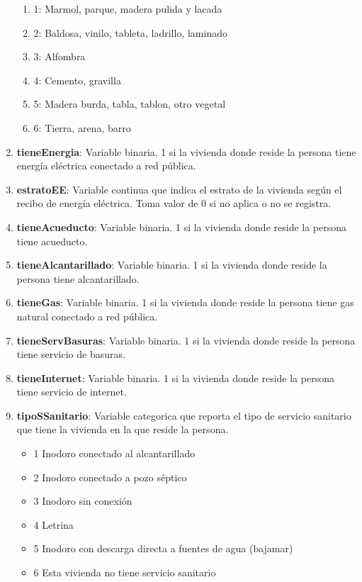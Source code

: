 \documentclass[12pt,a4paper]{article}
\begin{document}
\begin{enumerate}
\begin{enumerate}
			\item 1: Marmol, parque, madera pulida y lacada
			\item 2: Baldosa, vinilo, tableta, ladrillo, laminado
			\item 3: Alfombra
			\item 4: Cemento, gravilla
			\item 5: Madera burda, tabla, tablon, otro vegetal
			\item 6: Tierra, arena, barro
		\end{enumerate}
	\item \textbf{tieneEnergia}: Variable binaria. 1 si la vivienda donde reside la persona tiene energía eléctrica conectado a red pública.
	\item \textbf{estratoEE}: Variable continua que indica el estrato de la vivienda según el recibo de energía eléctrica. Toma valor de 0 si no aplica o no se registra.
	\item \textbf{tieneAcueducto}: Variable binaria. 1 si la vivienda donde reside la persona tiene acueducto.
	\item \textbf{tieneAlcantarillado}: Variable binaria. 1 si la vivienda donde reside la persona tiene alcantarillado.
	\item \textbf{tieneGas}: Variable binaria. 1 si la vivienda donde reside la persona tiene gas natural conectado a red pública.
	\item \textbf{tieneServBasuras}: Variable binaria. 1 si la vivienda donde reside la persona tiene servicio de basuras.
	\item \textbf{tieneInternet}: Variable binaria. 1 si la vivienda donde reside la persona tiene servicio de internet.
	\item \textbf{tipoSSanitario}: Variable categorica que reporta el tipo de servicio sanitario que tiene la vivienda en la que reside la persona.
		\begin{itemize}
			\item 1 Inodoro conectado al alcantarillado
			\item 2 Inodoro conectado a pozo séptico
			\item 3 Inodoro sin conexión
			\item 4 Letrina
			\item 5 Inodoro con descarga directa a fuentes de agua (bajamar)
			\item 6 Esta vivienda no tiene servicio sanitario
		\end{itemize}
	
\end{enumerate}
\end{document}
